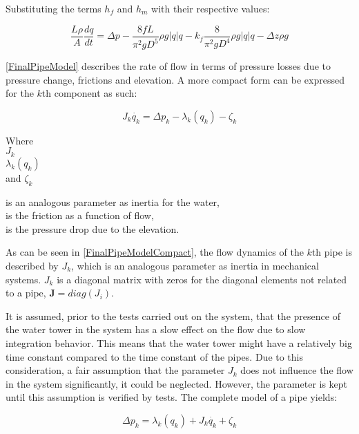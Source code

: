Substituting the terms $h_f$ and $h_m$ with their respective values:

\begin{equation}
\label{FinalPipeModel}
   \frac{L \rho}{A} \frac{dq}{dt} =\Delta p - \frac{8fL}{\pi^{2}gD^5} \rho g  |q| q - k_f \frac{8}{\pi^2gD^4} \rho g |q| q - \Delta z \rho g 
\end{equation}

\eqref{FinalPipeModel} describes the rate of flow in terms of pressure losses due to pressure change, frictions and elevation. A more compact form can be expressed for the $k$th component as such:

\begin{equation}
\label{FinalPipeModelCompact}
   J_k \dot{q_k} = \Delta p_k - \lambda_k(q_k) - \zeta_k 
\end{equation}

 \begin{minipage}[t]{0.20\textwidth}
Where\\
\hspace*{8mm} $J_k$ \\
\hspace*{8mm} $\lambda_k(q_k)$ \\
and \hspace*{0.7mm} $\zeta_k$ 
\end{minipage}
\begin{minipage}[t]{0.68\textwidth}
\vspace*{2mm}
is an analogous parameter as inertia for the water,\\ 
is the friction as a function of flow,\\
is the pressure drop due to the elevation.
\end{minipage}

As can be seen in \eqref{FinalPipeModelCompact}, the flow dynamics of the $k$th pipe is described by $J_k$, which is an analogous parameter as inertia in mechanical systems. $J_k$ is a diagonal matrix with zeros for the diagonal elements not related to a pipe, $\pmb{J} = diag(J_i)$.

It is assumed, prior to the tests carried out on the system, that the presence of the water tower in the system has a slow effect on the flow due to slow integration behavior. This means that the water tower might have a relatively big time constant compared to the time constant of the pipes. Due to this consideration, a fair assumption that the parameter $J_k$ does not influence the flow in the system significantly, it could be neglected. However, the parameter is kept until this assumption is verified by tests. The complete model of a pipe yields: 
  
\begin{equation}
\label{FinalPipeModelSimplified}
  \Delta p_k  =   \lambda_k(q_k) + J_k \dot{q_k} + \zeta_k 
\end{equation}


